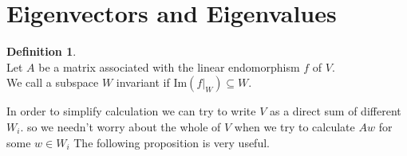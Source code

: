 \documentclass[12pt]{article}
\theoremstyle{definition}
\newtheorem{definition}[theorem]{Definition}
\theoremstyle{remark}
\theoremstyle{plain}
\begin{document}
\newpage
\section{Eigenvectors and Eigenvalues}

\begin{definition}\leavevmode \\
	Let $ A $ be a matrix associated with the linear endomorphism $f$ of $V$.\\ We call a subspace $W$ invariant if $\mathrm{Im}(f|_{W})\subseteq W $.
\end{definition}
In order to simplify calculation we can try to write $V$ as a direct sum of different $ W_i $. so we needn't worry about the whole of $ V $ when we try to calculate $Aw$ for some $w\in W_i$
The following proposition is very useful.
\end{document}
